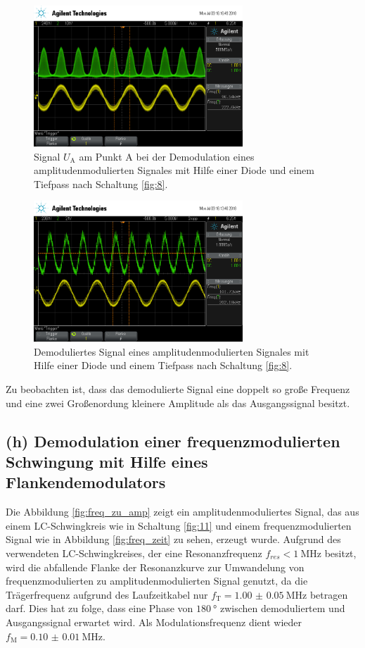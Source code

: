 \begin{figure}
  \centering
  \includegraphics[width=0.7\textwidth]{osci/amp_demod_diode_A.png}
  \caption{Signal $U_{\text{A}}$ am Punkt A bei der Demodulation eines amplitudenmodulierten Signales mit Hilfe einer
  Diode und einem Tiefpass nach Schaltung \ref{fig:8}.}
  \label{fig:diode_punkt_A}
\end{figure}


\begin{figure}
  \centering
  \includegraphics[width=0.7\textwidth]{osci/amp_demod_diode.png}
  \caption{Demoduliertes Signal eines amplitudenmodulierten Signales mit Hilfe einer
  Diode und einem Tiefpass nach Schaltung \ref{fig:8}.}
\label{fig:diode_demod_amp}
\end{figure}

Zu beobachten ist, dass das demodulierte Signal eine doppelt so große Frequenz
und eine zwei Großenordung kleinere Amplitude als das Ausgangssignal
besitzt.

\FloatBarrier
\subsection{(h) Demodulation einer frequenzmodulierten Schwingung
mit Hilfe eines Flankendemodulators}
\label{subsec:auswertung_h}
Die Abbildung \ref{fig:freq_zu_amp}
zeigt ein amplitudenmoduliertes Signal, das aus einem LC-Schwingkreis
wie in Schaltung \ref{fig:11} und einem frequenzmodulierten Signal wie in Abbildung
\ref{fig:freq_zeit} zu sehen, erzeugt wurde.
Aufgrund des verwendeten LC-Schwingkreises, der eine Resonanzfrequenz $f_{res}< \SI{1}{\mega\hertz}$ besitzt,
wird die abfallende Flanke der Resonanzkurve zur Umwandelung von
frequenzmodulierten zu amplitudenmodulierten Signal genutzt,
da die Trägerfrequenz
aufgrund des Laufzeitkabel nur $f_{\text{T}}=\SI{1.00(5)}{\mega\hertz}$ betragen darf.
Dies hat zu folge, dass eine Phase von $\SI{180}{\degree}$ zwischen demoduliertem und Ausgangssignal
erwartet wird.
Als Modulationsfrequenz dient wieder $f_{\text{M}}=\SI{0.10(1)}{\mega\hertz}$.

